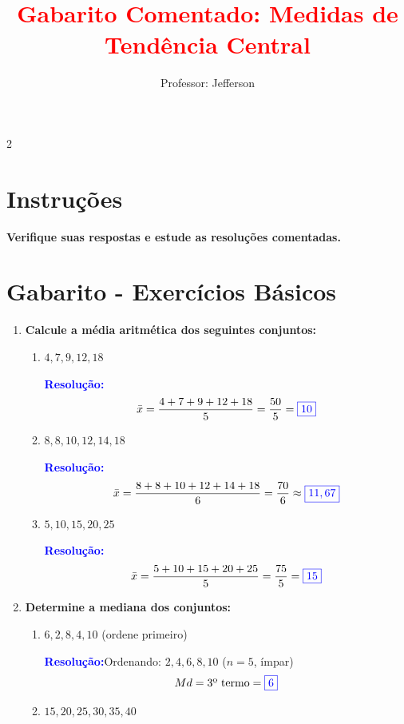 \documentclass[11pt]{article}
\title{\textcolor{red}{Gabarito Comentado: Medidas de Tendência Central}}
\author{Professor: Jefferson}
\date{}
\newcommand{\respostaNum}[1]{\textcolor{blue}{\boxed{#1}}}
\newcommand{\resolucao}{\textbf{\textcolor{blue}{Resolução:}}}
\begin{document}
\maketitle
\vspace{-1cm}

\begin{multicols}{2}

\section*{Instruções}
\textbf{Verifique suas respostas e estude as resoluções comentadas.}

\section*{Gabarito - Exercícios Básicos}

\begin{enumerate}[leftmargin=*]

\item \textbf{Calcule a média aritmética dos seguintes conjuntos:}

\begin{enumerate}[label=\alph*)]
\item $4, 7, 9, 12, 18$

\resolucao
\[
\bar{x} = \frac{4 + 7 + 9 + 12 + 18}{5} = \frac{50}{5} = \respostaNum{10}
\]

\item $8, 8, 10, 12, 14, 18$

\resolucao
\[
\bar{x} = \frac{8 + 8 + 10 + 12 + 14 + 18}{6} = \frac{70}{6} \approx \respostaNum{11,67}
\]

\item $5, 10, 15, 20, 25$

\resolucao
\[
\bar{x} = \frac{5 + 10 + 15 + 20 + 25}{5} = \frac{75}{5} = \respostaNum{15}
\]
\end{enumerate}

\item \textbf{Determine a mediana dos conjuntos:}

\begin{enumerate}[label=\alph*)]
\item $6, 2, 8, 4, 10$ (ordene primeiro)

\resolucao Ordenando: $2, 4, 6, 8, 10$ ($n = 5$, ímpar)
\[
Md = \text{3º termo} = \respostaNum{6}
\]

\item $15, 20, 25, 30, 35, 40$


\end{enumerate}
\end{enumerate}
\end{multicols}
\end{document}
